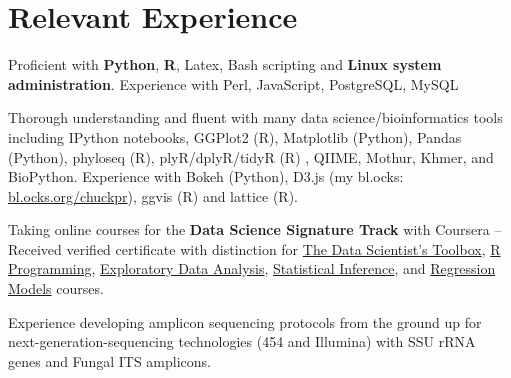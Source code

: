 \documentclass[letterpaper]{article}
\renewenvironment{itemize}{
  \begin{list}{}{
    \setlength{\leftmargin}{1.5em}
  }
}{
  \end{list}
}
\begin{document}
\section*{Relevant Experience}
\begin{itemize}
        {\small
    \item Proficient with \textbf{Python}, \textbf{R}, Latex, Bash
        scripting and \textbf{Linux system administration}. Experience
        with Perl, JavaScript, PostgreSQL, MySQL
    \item Thorough understanding and fluent with many data
        science/bioinformatics tools including IPython notebooks,
        GGPlot2 (R), Matplotlib (Python), Pandas (Python), phyloseq
        (R), plyR/dplyR/tidyR (R) , QIIME, Mothur, Khmer, and BioPython.
        Experience with Bokeh (Python), D3.js (my bl.ocks:
        \href{http://bl.ocks.org/chuckpr}{bl.ocks.org/chuckpr}), ggvis
        (R) and lattice (R).
    \item Taking online courses for the \textbf{Data Science
        Signature Track} with Coursera -- Received verified
        certificate with distinction for 
        \href{https://www.coursera.org/verify/TVZ2AX26SJ}{The Data Scientist's Toolbox},
        \href{https://www.coursera.org/verify/SB25Y92UJ6}{R Programming}, 
        \href{https://www.coursera.org/account/accomplishments/records/J75Um8uqQcrzBGDg}{Exploratory Data Analysis}, 
        \href{https://www.coursera.org/account/accomplishments/records/TXAWtJZV6hSe2U8G}{Statistical Inference}, and
        \href{https://www.coursera.org/account/accomplishments/records/pTVzUYHgx4sbcUmY}{Regression Models}
        courses.
    \item Experience developing amplicon sequencing protocols from the
        ground up for next-generation-sequencing technologies (454 and
        Illumina) with SSU rRNA genes and Fungal ITS amplicons.
        }
\end{itemize}
\end{document}
